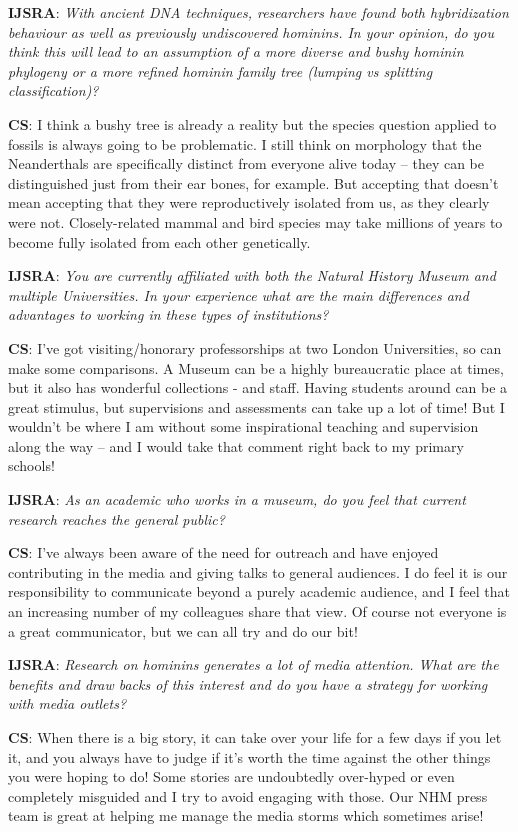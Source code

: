 \documentclass{ijsra}
\begin{document}
\textbf{IJSRA}: \textit{With ancient DNA techniques, researchers have found both hybridization behaviour as well as
previously undiscovered hominins.
In your opinion, do you think this will lead to an assumption of a more diverse and bushy hominin phylogeny or
a more refined hominin family tree (lumping vs splitting classification)?}

\textbf{CS}: I think a bushy tree is already a reality but the species question applied to fossils is always going to be problematic.
I still think on morphology that the Neanderthals are specifically distinct from everyone alive today – they can be
distinguished just from their ear bones, for example.
But accepting that doesn’t mean accepting that they were reproductively isolated from us, as they clearly were not.
Closely-related mammal and bird species may take millions of years to become fully isolated from each other genetically.

\textbf{IJSRA}: \textit{You are currently affiliated with both the Natural History Museum and multiple Universities.
In your experience what are the main differences and advantages to working in these types of institutions?}

\textbf{CS}: I’ve got visiting/honorary professorships at two London Universities, so can make some comparisons.
A Museum can be a highly bureaucratic place at times, but it also has wonderful collections - and staff.
Having students around can be a great stimulus, but supervisions and assessments can take up a lot of time!
But I wouldn’t be where I am without some inspirational teaching and supervision along the way – and
I would take that comment right back to my primary schools!

\textbf{IJSRA}: \textit{As an academic who works in a museum, do you feel that current research reaches the general public?}

\textbf{CS}: I’ve always been aware of the need for outreach and have enjoyed contributing in the media and
giving talks to general audiences.
I do feel it is our responsibility to communicate beyond a purely academic audience, and I feel that an increasing number of
my colleagues share that view. 
Of course not everyone is a great communicator, but we can all try and do our bit!

\textbf{IJSRA}: \textit{Research on hominins generates a lot of media attention.
What are the benefits and draw backs of this interest and do you have a strategy for working with media outlets?}

\textbf{CS}: When there is a big story, it can take over your life for a few days if you let it,
and you always have to judge if it’s worth the time against the other things you were hoping to do!
Some stories are undoubtedly over-hyped or even completely misguided and I try to avoid engaging with those.
Our NHM press team is great at helping me manage the media storms which sometimes arise!
\end{document}
